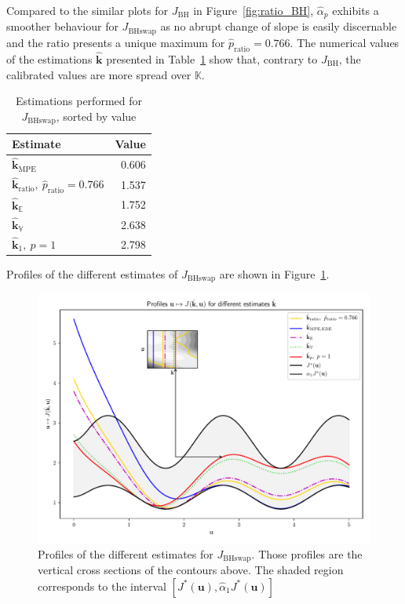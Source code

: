 \documentclass[preprint, review, 1p]{elsarticle}
\newcommand{\Ex}{\mathbb{E}}
\newcommand{\hatkmean}{\hat{\mathbf{k}}_{\Ex}}
\newcommand{\hatkvar}{\hat{\mathbf{k}}_{\mathbb{V}}}
\newcommand{\kest}{\hat{\mathbf{k}}}
\newcommand{\checka}{{\alpha}}
\newcommand{\Kspace}{\mathbb{K}}
\newcommand{\JBH}{J_{\mathrm{BH}}}
\newcommand{\JBHS}{J_{\mathrm{BHswap}}}
\newlength{\onehalfcolumn}
\begin{document}
Compared to the similar plots for $\JBH$ in Figure~\ref{fig:ratio_BH}, $\hat{\checka}_p$ exhibits a smoother behaviour for $\JBHS$ as no abrupt change of slope is easily discernable and the ratio presents a unique maximum for $\hat{p}_{\mathrm{ratio}}=0.766$. The numerical values of the estimations $\kest$ presented in Table~\ref{tab:recap_estimates_BHs} show that, contrary to $\JBH$, the calibrated values are more spread over $\Kspace$.

\begin{table}[!h]
\centering
\caption{Estimations performed for $\JBHS$, sorted by value}
\label{tab:recap_estimates_BHs}
\begin{tabular}{lr} \toprule
Estimate & Value \\ \midrule
$\kest_{\mathrm{MPE}}$ & 0.606 \\ 
$\kest_{\mathrm{ratio}},~ \hat{p}_{\mathrm{ratio}}=0.766$ & 1.537 \\ 
$\hatkmean$ & 1.752 \\ 
$\hatkvar$ & 2.638 \\ 
$\kest_1,~p=1$ & 2.798   \\ \bottomrule
\end{tabular}
\end{table}


Profiles of the different estimates of $\JBHS$ are shown in Figure~\ref{fig:profiles_branin_switch}.

\begin{figure}[!h]
  \centering
\includegraphics[width=\onehalfcolumn]{Figures/FIG09.pdf}
\caption{Profiles of the different estimates for $\JBHS$. Those profiles are the vertical cross sections of the contours above. The shaded region corresponds to the interval $[J^*(\mathbf{u}), \hat{\checka}_1 J^*(\mathbf{u})]$}
\label{fig:profiles_branin_switch}
\end{figure}
\end{document}
